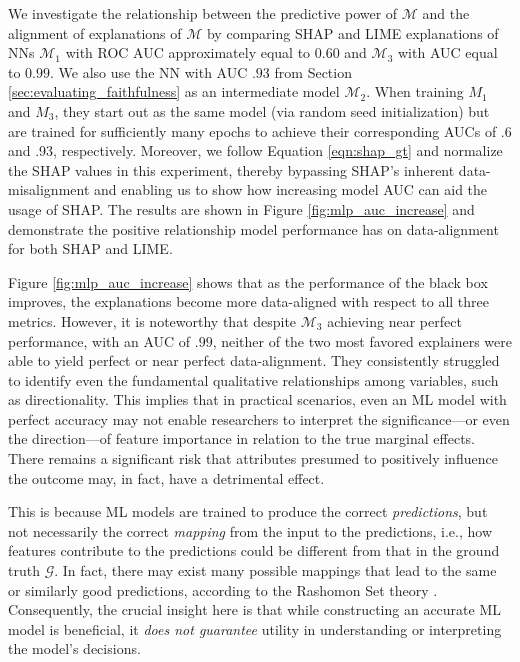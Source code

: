 \documentclass[12pt]{article}  %
\newcommand{\mM}{\mathcal{M}}
\begin{document}
            
            We investigate the relationship between the predictive power of $\mathcal{M}$ and the alignment of explanations of $\mM$ by comparing SHAP and LIME explanations of NNs $\mathcal{M}_1$  with ROC AUC approximately equal to $0.60$ and $\mathcal{M}_3$ with AUC equal to $0.99$. We also use the NN with AUC $.93$ from Section \ref{sec:evaluating_faithfulness} as an intermediate model $\mathcal{M}_2$. When training $M_1$ and $M_3$, they start out as the same model (via random seed initialization) but are trained for sufficiently many epochs to achieve their corresponding AUCs of .6 and .93, respectively. Moreover, we follow Equation \ref{eqn:shap_gt} and normalize the SHAP values in this experiment, thereby bypassing SHAP's inherent data-misalignment and enabling us to show how increasing model AUC can aid the usage of SHAP. The results are shown in Figure \ref{fig:mlp_auc_increase} and demonstrate the positive relationship model performance has on data-alignment for both SHAP and LIME.
            
     Figure \ref{fig:mlp_auc_increase} shows that as the performance of the black box improves, the explanations become more data-aligned with respect to all three metrics. However, it is noteworthy that despite $\mathcal{M}_3$ achieving near perfect performance, with an AUC of $.99$, neither of the two most favored explainers were able to yield perfect or near perfect data-alignment. They consistently struggled to identify even the fundamental qualitative relationships among variables, such as directionality. This implies that in practical scenarios, even an ML model with perfect accuracy may not enable researchers to interpret the significance—or even the direction—of feature importance in relation to the true marginal effects. There remains a significant risk that attributes presumed to positively influence the outcome may, in fact, have a detrimental effect. 
     
     This is because ML models are trained to produce the correct \emph{predictions}, but not necessarily the correct \emph{mapping} from the input to the predictions, i.e., how features contribute to the predictions could be different from that in the ground truth $\mathcal{G}$. In fact, there may exist many possible mappings that lead to the same or similarly good predictions, according to the Rashomon Set theory \citep{semenova22rashomon}.
      Consequently, the crucial insight here is that while constructing an accurate ML model is beneficial, it \emph{does not guarantee} utility in understanding or interpreting the model's decisions. 
\end{document}
